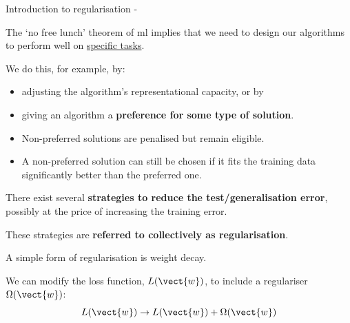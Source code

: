 
\begin{frame}[t,allowframebreaks]{Introduction to regularisation -}

The `no free lunch' theorem of \gls{ml} implies that we
need to design our algorithms 
to perform well on \underline{specific tasks}.

\vspace{0.2cm}

We do this, for example, by:
\begin{itemize}
    \item adjusting the algorithm's 
    \gls{representational capacity}, or by    
    \item giving an algorithm a 
    {\bf preference for some type of solution}.
\end{itemize}

\vspace{0.1cm}

\begin{blockexample}{}
\begin{itemize}
    \small
    \item 
    Non-preferred solutions are penalised but remain eligible.
    \item 
    A non-preferred solution can still be chosen if it fits the training 
    data significantly better than the preferred one.
\end{itemize}
\end{blockexample}

\vspace{0.3cm}

There exist several {\bf strategies to reduce the test/generalisation error},
possibly at the price of increasing the training error.\\
\vspace{0.2cm}

These strategies are {\bf referred to collectively as
\gls{regularisation}}.


\framebreak

%
%

A simple form of \gls{regularisation} is 
\gls{weight decay}.\\
\vspace{0.2cm}

We can modify the loss function, $L(\vect{w})$, 
to include a \gls{regulariser} $\Omega(\vect{w})$:
\begin{equation}
    L(\vect{w}) \rightarrow L(\vect{w}) + \Omega(\vect{w})
\end{equation}\\


\end{frame}
